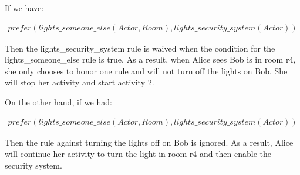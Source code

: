 If we have:

\begin{equation}
\begin{split}
prefer(lights\_someone\_else(Actor, Room), lights\_security\_system(Actor))
\end{split}
\end{equation}

Then the lights\_security\_system rule is waived when the condition for the lights\_someone\_else rule is true.
As a result, when Alice sees Bob is in room r4, she only chooses to honor one rule and will not turn off the lights on Bob.
She will stop her activity and start activity 2.

On the other hand, if we had:

\begin{equation}
\begin{split}
prefer(lights\_someone\_else(Actor, Room), lights\_security\_system(Actor))
\end{split}
\end{equation}

Then the rule against turning the lights off on Bob is ignored.
As a result, Alice will continue her activity to turn the light in room r4 and then enable the security system.

%
